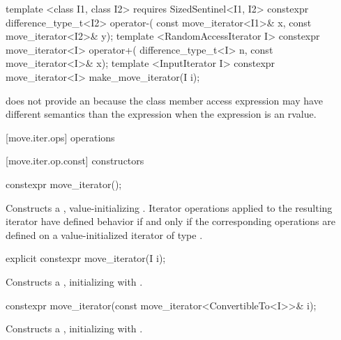 \begin{codeblock}
{{{{  template <class I1, class I2>
      requires SizedSentinel<I1, I2>
    constexpr difference_type_t<I2> operator-(
      const move_iterator<I1>& x,
      const move_iterator<I2>& y);
  template <RandomAccessIterator I>
    constexpr move_iterator<I> operator+(
      difference_type_t<I> n,
      const move_iterator<I>& x);
  template <InputIterator I>
    constexpr move_iterator<I> make_move_iterator(I i);
}}}}
\end{codeblock}

\pnum
\enternote {} does not provide an  because the class member access
expression  may have different semantics than the expression
 when the expression  is an rvalue.\exitnote

[move.iter.ops]{ operations}

[move.iter.op.const]{ constructors}

%
\begin{itemdecl}
constexpr move_iterator();
\end{itemdecl}

\begin{itemdescr}
\pnum
\effects Constructs a , value-initializing
. Iterator operations applied to the resulting
iterator have defined behavior if and only if the corresponding operations are defined
on a value-initialized iterator of type .
\end{itemdescr}


%
\begin{itemdecl}
explicit constexpr move_iterator(I i);
\end{itemdecl}

\begin{itemdescr}
\pnum
\effects Constructs a , initializing
 with .
\end{itemdescr}


%
\begin{itemdecl}
constexpr move_iterator(const move_iterator<ConvertibleTo<I>>& i);
\end{itemdecl}

\begin{itemdescr}
\pnum
\effects Constructs a , initializing
 with .
\end{itemdescr}

